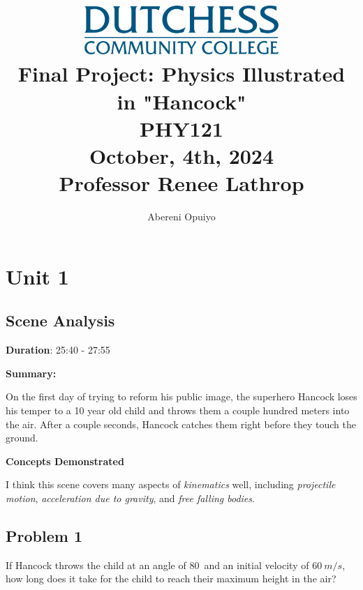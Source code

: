 \documentclass[a4paper,12pt]{article}
\title{
    \vspace{5cm} %
    \includegraphics[width=0.55\textwidth]{dutchess-logo-blue.png} \\ %
    \vspace{1cm} %
    \textbf{\Huge Final Project: Physics Illustrated in "Hancock"} \\
    \vspace{1cm} %
    \large PHY121 \\
    \vspace{0.5cm} %
    \large	October, 4th, 2024 \\ 
		\vspace{.5cm}
		\large Professor Renee Lathrop 
}
\author{Abereni Opuiyo}
\date{}
\begin{document}
\maketitle
	\thispagestyle{plain}
\newpage




\setcounter{secnumdepth}{0}
\setcounter{page}{1}  %
\tableofcontents
\thispagestyle{fancy}
\newpage

\section{Unit 1}

\vspace{-0.5cm}
\singlespacing

\subsection{Scene Analysis}

\textbf{Duration}: 25:40 - 27:55

\vspace{0.3cm}
\noindent\textbf{Summary:} \par
On the first day of trying to reform his public image, the superhero Hancock loses his temper to a 10 year old child and throws them a couple hundred meters into the air. After a couple seconds, Hancock catches them right before they touch the ground. \par


\vspace{0.3cm}
\noindent\textbf{Concepts Demonstrated} \par
I think this scene covers many aspects of \textit{kinematics} well, including \textit{projectile motion}, \textit{acceleration due to gravity}, and \textit{free falling bodies}. 

\subsection{Problem 1}

If Hancock throws the child at an angle of 80\degree\ and an initial velocity of $60\ {m/s}$, how long does it take for the child to reach their maximum height in the air?
\end{document}
